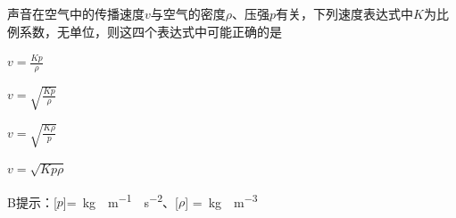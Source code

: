 声音在空气中的传播速度\(v\)与空气的密度\(\rho\)、压强\(p\)有关，下列速度表达式中\(K\)为比例系数，无单位，则这四个表达式中可能正确的是\paren[B]
\begin{choices}
    \item \(v = \frac{Kp}{\rho}\)
    \item \(v = \sqrt{\frac{Kp}{\rho}}\)
    \item \(v = \sqrt{\frac{K\rho}{p}}\)
    \item \(v = \sqrt{Kp\rho}\)
\end{choices}
\begin{answer}
    B\qquad 提示：[\(p\)]=\qty{}{kg\cdot m^{-1}\cdot s^{-2}}、[\(\rho\)] =\qty{}{kg\cdot m^{-3}}
\end{answer}